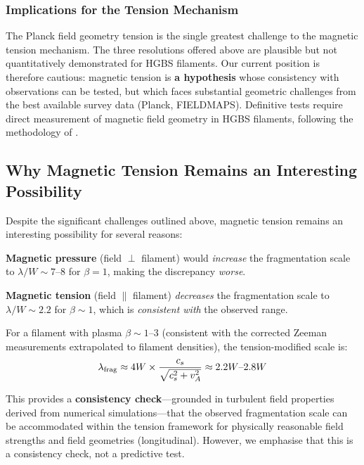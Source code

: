 \documentclass[11pt,a4paper]{article}
\begin{document}
\subsubsection{Implications for the Tension Mechanism}

The Planck field geometry tension is the single greatest challenge to the magnetic tension mechanism. The three resolutions offered above are plausible but not quantitatively demonstrated for HGBS filaments. Our current position is therefore cautious: magnetic tension is \textbf{a hypothesis} whose consistency with observations can be tested, but which faces substantial geometric challenges from the best available survey data (Planck, FIELDMAPS). Definitive tests require direct measurement of magnetic field geometry in HGBS filaments, following the methodology of \citet{Jadhav2026}.

\subsection{Why Magnetic Tension Remains an Interesting Possibility}

Despite the significant challenges outlined above, magnetic tension remains an interesting possibility for several reasons:

\textbf{Magnetic pressure} (field $\perp$ filament) would \textit{increase} the fragmentation scale to $\lambda/W \sim 7$--$8$ for $\beta = 1$, making the discrepancy \textit{worse}.

\textbf{Magnetic tension} (field $\parallel$ filament) \textit{decreases} the fragmentation scale to $\lambda/W \sim 2.2$ for $\beta \sim 1$, which is \textit{consistent with} the observed range.

For a filament with plasma $\beta \sim 1$--$3$ (consistent with the corrected Zeeman measurements extrapolated to filament densities), the tension-modified scale is:
\begin{equation}
\lambda_{\rm frag} \approx 4W \times \frac{c_s}{\sqrt{c_s^2 + v_A^2}} \approx 2.2W\text{--}2.8W
\label{eq:tension2}
\end{equation}

This provides a \textbf{consistency check}—grounded in turbulent field properties derived from numerical simulations—that the observed fragmentation scale can be accommodated within the tension framework for physically reasonable field strengths and field geometries (longitudinal). However, we emphasise that this is a consistency check, not a predictive test.
\end{document}
